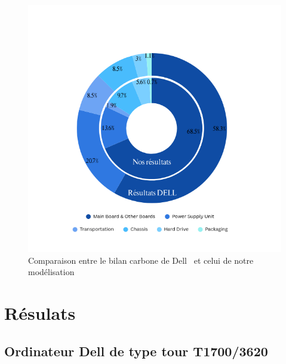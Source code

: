 \documentclass[12pt,a4paper]{paper}
\begin{document}
\begin{figure}[H]%
    \centering
    \includegraphics[width=\linewidth, trim=80 0 80 90, clip]{img/graph-dell-vs-our.png}
    \caption{Comparaison entre le bilan carbone de Dell~\cite{Dell2018} et celui de notre modélisation}
    \label{fig:computer-impact}
\end{figure}
\section{Résulats}
\subsection{Ordinateur Dell de type tour T1700/3620}
\label{sec:computer}
\end{document}
